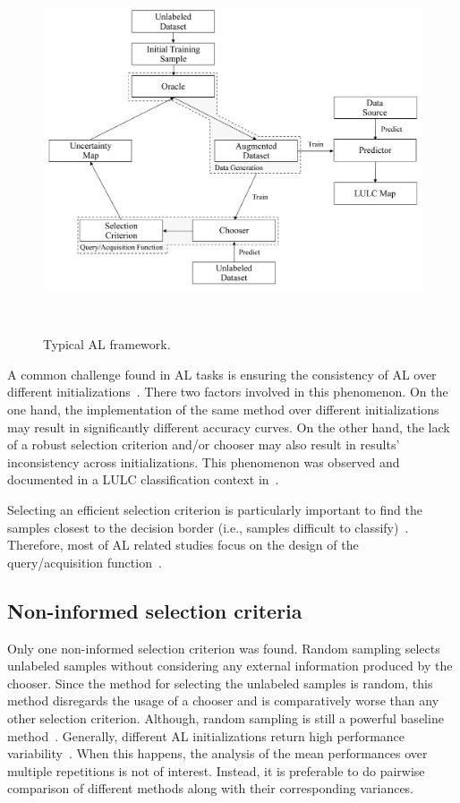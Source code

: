 \documentclass[parskip=full]{scrartcl}
\begin{document}
\begin{figure}[htb]
	\centering
	\includegraphics[width=.85\linewidth]{../analysis/al_typical}
	\caption{Typical AL framework.
    }~\label{fig:al_typical}
\end{figure}

A common challenge found in AL tasks is ensuring the consistency of AL over different
initializations~\cite{Kottke2017}. There two factors involved in this phenomenon. On the one hand,
the implementation of the same method over different initializations may result in significantly
different accuracy curves. On the other hand, the lack of a robust selection criterion and/or
chooser may also result in results' inconsistency across initializations. This phenomenon was
observed and documented in a LULC classification context in~\cite{tuia2011using}.

Selecting an efficient selection criterion is particularly important to find the samples closest
to the decision border (i.e., samples difficult to classify)~\cite{Shrivastava2021}. Therefore, most
of AL related studies focus on the design of the query/acquisition function~\cite{Su2020}.

\subsection{Non-informed selection criteria}

Only one non-informed selection criterion was found. Random sampling selects unlabeled samples
without considering any external information produced by the chooser. Since the method for selecting
the unlabeled samples is random, this method disregards the usage of a chooser and is comparatively
worse than any other selection criterion. Although, random sampling is still a powerful baseline
method~\cite{Cawley2011}. Generally, different AL initializations return high performance
variability~\cite{Kottke2017}. When this happens, the analysis of the mean performances over multiple
repetitions is not of interest. Instead, it is preferable to do pairwise comparison of different
methods along with their corresponding variances. 
\end{document}
